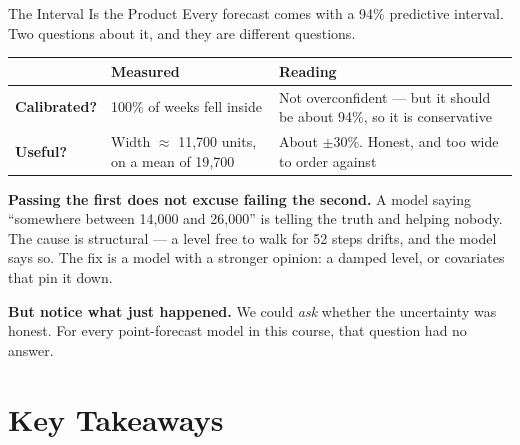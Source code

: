 \documentclass[aspectratio=169, 11pt]{beamer}
\begin{document}
\begin{frame}{The Interval Is the Product}
  Every forecast comes with a 94\% predictive interval. Two questions about it, and they are
  different questions.
  \begin{center}
    {\small
    \begin{tabular}{p{3.0cm}p{4.0cm}p{5.3cm}}
      \toprule
      & \textbf{Measured} & \textbf{Reading} \\
      \midrule
      \textbf{Calibrated?} & 100\% of weeks fell inside & Not overconfident --- but it should be
      about 94\%, so it is conservative \\[3pt]
      \textbf{Useful?} & Width $\approx$ 11{,}700 units, on a mean of 19{,}700 & About $\pm$30\%.
      Honest, and too wide to order against \\
      \bottomrule
    \end{tabular}
    }
  \end{center}

  \vspace{-0.1cm}
  \textbf{Passing the first does not excuse failing the second.} A model saying ``somewhere
  between 14{,}000 and 26{,}000'' is telling the truth and helping nobody. The cause is
  structural --- a level free to walk for 52 steps drifts, and the model says so. The fix is a
  model with a stronger opinion: a damped level, or covariates that pin it down.

  \vspace{0.05cm}
  \textbf{But notice what just happened.} We could \emph{ask} whether the uncertainty was honest.
  For every point-forecast model in this course, that question had no answer.
\end{frame}

\section{Key Takeaways}

\end{document}
